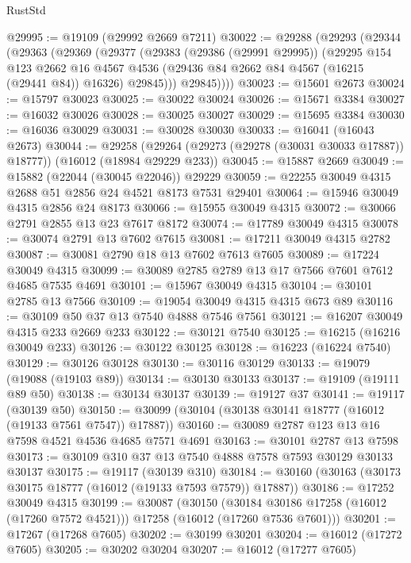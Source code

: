 \begin{lexlean}{RustStd}
\begin{coremodule}
@29995 := @19109 (@29992 @2669 @7211)
@30022 := @29288
    (@29293
      (@29344
        (@29363
          (@29369
            (@29377
              (@29383
                (@29386 (@29991 @29995))
                (@29295
                  @154
                  @123
                  @2662
                  @16
                  @4567
                  @4536
                  (@29436 @84 @2662 @84 @4567 (@16215 (@29441 @84)) @16326)
                  @29845)))
            @29845))))
@30023 := @15601 @2673
@30024 := @15797 @30023
@30025 := @30022 @30024
@30026 := @15671 @3384
@30027 := @16032 @30026
@30028 := @30025 @30027
@30029 := @15695 @3384
@30030 := @16036 @30029
@30031 := @30028 @30030
@30033 := @16041 (@16043 @2673)
@30044 := @29258
    (@29264 (@29273 (@29278 (@30031 @30033 @17887)) @18777))
    (@16012 (@18984 @29229 @233))
@30045 := @15887 @2669
@30049 := @15882 (@22044 (@30045 @22046)) @29229
@30059 := @22255 @30049 @4315 @2688 @51 @2856 @24 @4521 @8173 @7531 @29401
@30064 := @15946 @30049 @4315 @2856 @24 @8173
@30066 := @15955 @30049 @4315
@30072 := @30066 @2791 @2855 @13 @23 @7617 @8172
@30074 := @17789 @30049 @4315
@30078 := @30074 @2791 @13 @7602 @7615
@30081 := @17211 @30049 @4315 @2782
@30087 := @30081 @2790 @18 @13 @7602 @7613 @7605
@30089 := @17224 @30049 @4315
@30099 := @30089 @2785 @2789 @13 @17 @7566 @7601 @7612 @4685 @7535 @4691
@30101 := @15967 @30049 @4315
@30104 := @30101 @2785 @13 @7566
@30109 := @19054 @30049 @4315 @4315 @673 @89
@30116 := @30109 @50 @37 @13 @7540 @4888 @7546 @7561
@30121 := @16207 @30049 @4315 @233 @2669 @233
@30122 := @30121 @7540
@30125 := @16215 (@16216 @30049 @233)
@30126 := @30122 @30125
@30128 := @16223 (@16224 @7540)
@30129 := @30126 @30128
@30130 := @30116 @30129
@30133 := @19079 (@19088 (@19103 @89))
@30134 := @30130 @30133
@30137 := @19109 (@19111 @89 @50)
@30138 := @30134 @30137
@30139 := @19127 @37
@30141 := @19117 (@30139 @50)
@30150 := @30099 (@30104 (@30138 @30141 @18777 (@16012 (@19133 @7561 @7547)) @17887))
@30160 := @30089 @2787 @123 @13 @16 @7598 @4521 @4536 @4685 @7571 @4691
@30163 := @30101 @2787 @13 @7598
@30173 := @30109 @310 @37 @13 @7540 @4888 @7578 @7593 @30129 @30133 @30137
@30175 := @19117 (@30139 @310)
@30184 := @30160 (@30163 (@30173 @30175 @18777 (@16012 (@19133 @7593 @7579)) @17887))
@30186 := @17252 @30049 @4315
@30199 := @30087
    (@30150
      (@30184 @30186 @17258 (@16012 (@17260 @7572 @4521)))
      @17258
      (@16012 (@17260 @7536 @7601)))
@30201 := @17267 (@17268 @7605)
@30202 := @30199 @30201
@30204 := @16012 (@17272 @7605)
@30205 := @30202 @30204
@30207 := @16012 (@17277 @7605)

\end{coremodule}
\end{lexlean}
